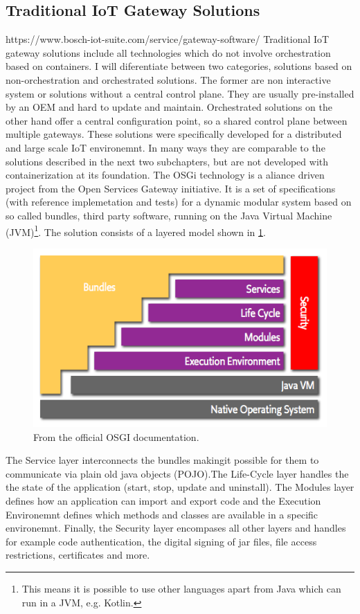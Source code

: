 \subsection{Traditional IoT Gateway Solutions}
https://www.bosch-iot-suite.com/service/gateway-software/
Traditional IoT gateway solutions include all technologies which do not involve orchestration based on containers. I will diferentiate between two categories, solutions based on non-orchestration and orchestrated solutions. The former are non interactive system or solutions without a central control plane. They are usually pre-installed by an OEM and hard to update and maintain. Orchestrated solutions on the other hand offer a central configuration point, so a shared control plane between multiple gateways. These solutions were specifically developed for a distributed and large scale IoT environemnt. In many ways they are comparable to the solutions described in the next two subchapters, but are not developed with containerization at its foundation. The OSGi technology\cite{osgiDefintion25:online} is a aliance driven project from the Open Services Gateway initiative. It is a set of specifications (with reference implemetation and tests) for a dynamic modular system based on so called bundles, third party software, running on the Java Virtual Machine (JVM)\footnote{This means it is possible to use other languages apart from Java which can run in a JVM, e.g. Kotlin.}. The solution consists of a layered model shown in \cref{fig:osgiLayerModel}. 
\begin{figure}[h!]
    \centering
    \includegraphics[scale=1.8]{figures/layering-osgi.png}
    \caption{From the official OSGI documentation\cite{osgiFrameworkArchitec22:online}.}
    \label{fig:osgiLayerModel}
\end{figure}
The Service layer interconnects the bundles makingit possible for them to communicate via plain old java objects (POJO).The Life-Cycle layer handles the the state of the application (start, stop, update and uninstall). The Modules layer defines how an application can import and export code and the Execution Environemnt defines which methods and classes are available in a specific environemnt. Finally, the Security layer encompases all other layers and handles for example code authentication, the digital signing of jar files, file access restrictions, certificates and more.\\

